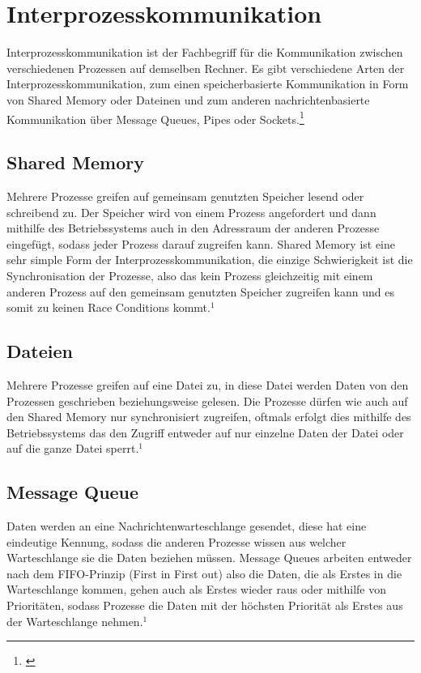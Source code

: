 \section{Interprozesskommunikation}
Interprozesskommunikation ist der Fachbegriff für die Kommunikation zwischen verschiedenen Prozessen auf demselben Rechner. Es gibt verschiedene Arten der Interprozesskommunikation, zum einen speicherbasierte Kommunikation in Form von Shared Memory oder Dateinen und zum anderen nachrichtenbasierte Kommunikation über Message Queues, Pipes oder Sockets.\footnote[1]{\cite[Vgl.][]{30}} 


\subsection{Shared Memory}
Mehrere Prozesse greifen auf gemeinsam genutzten Speicher lesend oder schreibend zu. Der Speicher wird von einem Prozess angefordert und dann mithilfe des Betriebssystems auch in den Adressraum der anderen Prozesse eingefügt, sodass jeder Prozess darauf zugreifen kann. Shared Memory ist eine sehr simple Form der Interprozesskommunikation, die einzige Schwierigkeit ist die Synchronisation der Prozesse, also das kein Prozess gleichzeitig mit einem anderen Prozess auf den gemeinsam genutzten Speicher zugreifen kann und es somit zu keinen Race Conditions kommt.$^{1}$


\subsection{Dateien}
Mehrere Prozesse greifen auf eine Datei zu, in diese Datei werden Daten von den Prozessen geschrieben beziehungsweise gelesen. Die Prozesse dürfen wie auch auf den Shared Memory nur synchronisiert zugreifen, oftmals erfolgt dies mithilfe des Betriebssystems das den Zugriff entweder auf nur einzelne Daten der Datei oder auf die ganze Datei sperrt.$^{1}$

\subsection{Message Queue}
Daten werden an eine Nachrichtenwarteschlange gesendet, diese hat eine eindeutige Kennung, sodass die anderen Prozesse wissen aus welcher Warteschlange sie die Daten beziehen müssen. Message Queues arbeiten entweder nach dem FIFO-Prinzip (First in First out) also die Daten, die als Erstes in die Warteschlange kommen, gehen auch als Erstes wieder raus oder mithilfe von Prioritäten, sodass Prozesse die Daten mit der höchsten Priorität als Erstes aus der Warteschlange nehmen.$^{1}$ 

